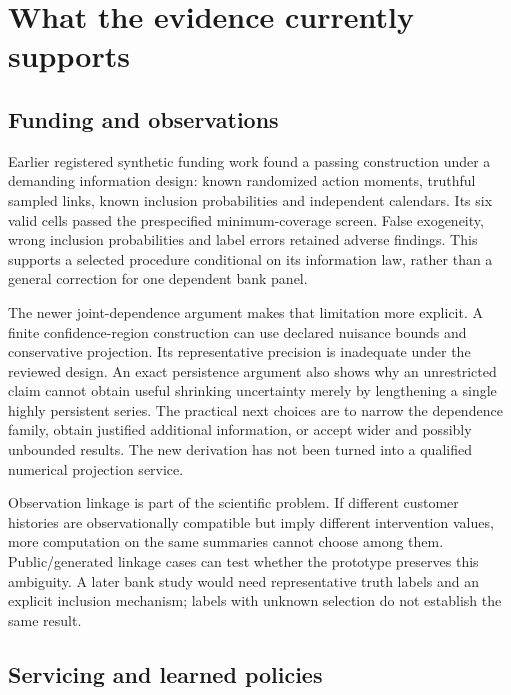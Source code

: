\hypertarget{what-the-evidence-currently-supports}{%
\section{What the evidence currently
supports}\label{what-the-evidence-currently-supports}}

\hypertarget{funding-and-observations}{%
\subsection{Funding and observations}\label{funding-and-observations}}

Earlier registered synthetic funding work found a passing construction
under a demanding information design: known randomized action moments,
truthful sampled links, known inclusion probabilities and independent
calendars. Its six valid cells passed the prespecified minimum-coverage
screen. False exogeneity, wrong inclusion probabilities and label errors
retained adverse findings. This supports a selected procedure
conditional on its information law, rather than a general correction for
one dependent bank panel. \citep{sp13_funding}

The newer joint-dependence argument makes that limitation more explicit.
A finite confidence-region construction can use declared nuisance bounds
and conservative projection. Its representative precision is inadequate
under the reviewed design. An exact persistence argument also shows why
an unrestricted claim cannot obtain useful shrinking uncertainty merely
by lengthening a single highly persistent series. The practical next
choices are to narrow the dependence family, obtain justified additional
information, or accept wider and possibly unbounded results. The new
derivation has not been turned into a qualified numerical projection
service. \citep{sp13_persistence}

Observation linkage is part of the scientific problem. If different
customer histories are observationally compatible but imply different
intervention values, more computation on the same summaries cannot
choose among them. Public/generated linkage cases can test whether the
prototype preserves this ambiguity. A later bank study would need
representative truth labels and an explicit inclusion mechanism; labels
with unknown selection do not establish the same result.
\citep{sp13_public,sp13_persistence}

\hypertarget{servicing-and-learned-policies}{%
\subsection{Servicing and learned
policies}\label{servicing-and-learned-policies}}

